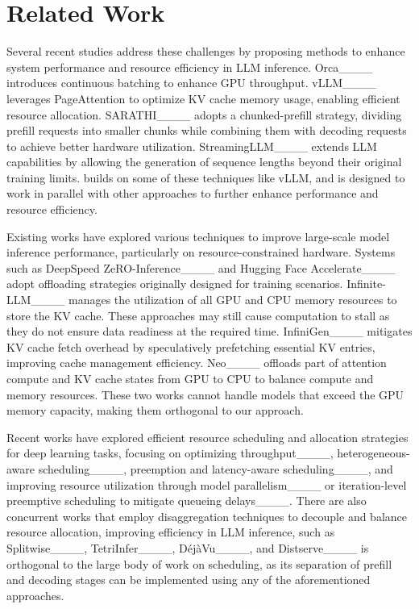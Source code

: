 \section{Related Work}
\label{sec:relwk}

Several recent studies address these challenges by proposing methods to enhance system performance and resource efficiency in LLM inference. 
Orca____ introduces continuous batching to enhance GPU throughput. 
vLLM____ leverages PageAttention to optimize KV cache memory usage, enabling efficient resource allocation. 
SARATHI____ adopts a chunked-prefill strategy, dividing prefill requests into smaller chunks while combining them with decoding requests to achieve better hardware utilization. 
StreamingLLM____ extends LLM capabilities by allowing the generation of sequence lengths beyond their original training limits. 
\sys builds on some of these techniques like vLLM, and is designed to work in parallel with other approaches to further enhance performance and resource efficiency.

Existing works have explored various techniques to improve large-scale model inference performance, particularly on resource-constrained hardware. 
Systems such as DeepSpeed ZeRO-Inference____ and Hugging Face Accelerate____ adopt offloading strategies originally designed for training scenarios. 
Infinite-LLM____ manages the utilization of all GPU and CPU memory resources to store the KV cache.
These approaches may still cause computation to stall as they do not ensure data readiness at the required time.
InfiniGen____ mitigates KV cache fetch overhead by speculatively prefetching essential KV entries, improving cache management efficiency. 
Neo____ offloads part of attention compute and KV cache states from GPU to CPU to balance compute and memory resources.
These two works cannot handle models that exceed the GPU memory capacity, making them orthogonal to our approach.

Recent works have explored efficient resource scheduling and allocation strategies for deep learning tasks, focusing on optimizing throughput____, 
heterogeneous-aware scheduling____, preemption and latency-aware scheduling____, 
and improving resource utilization through model parallelism____ or iteration-level preemptive scheduling to mitigate queueing delays____.
There are also concurrent works that employ disaggregation techniques to decouple and balance resource allocation, 
improving efficiency in LLM inference, such as Splitwise____, TetriInfer____, DéjàVu____, and Distserve____
\sys is orthogonal to the large body of work on scheduling, as its separation of prefill and decoding stages can be implemented using any of the aforementioned approaches.